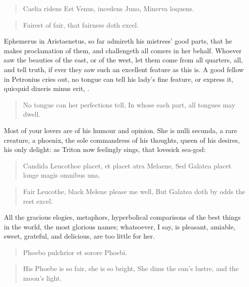 \begin{latin}
\begin{verse}
Caelia ridens
Est Venus, incedens Juno, Minerva loquens.
\end{verse}
\end{latin}

\begin{verse}%
Fairest of fair, that fairness doth excel.
\end{verse}%

Ephemerus in Aristaenetus, so far admireth his mistress' good parts,
that he makes proclamation of them, and challengeth all comers in her
behalf. Whoever saw the beauties of the east, or of the west, let
them come from all quarters, all, and tell truth, if ever they saw such
an excellent feature as this is. A good fellow in Petronius cries out,
no tongue can tell his lady's fine feature, or express it,
quicquid dixeris minus erit, \etc{}.

\begin{verse}%
No tongue can her perfections tell,
In whose each part, all tongues may dwell.
\end{verse}%

Most of your lovers are of his humour and opinion. She is nulli
secunda, a rare creature, a phoenix, the sole commandress of his
thoughts, queen of his desires, his only delight: as Triton now
feelingly sings, that lovesick sea-god:

\begin{latin}
\begin{verse}
Candida Leucothoe placet, et placet atra Melaene,
Sed Galatea placet longe magis omnibus una.
\end{verse}
\end{latin}
\translationrule%
\begin{verse}%
Fair Leucothe, black Melene please me well,
But Galatea doth by odds the rest excel.
\end{verse}%

All the gracious elogies, metaphors, hyperbolical comparisons of the
best things in the world, the most glorious names; whatsoever, I say,
is pleasant, amiable, sweet, grateful, and delicious, are too little
for her.

\begin{latin}
\begin{verse}
Phoebo pulchrior et sorore Phoebi.
\end{verse}
\end{latin}
\translationrule%
\begin{verse}%
His Phoebe is so fair, she is so bright,
She dims the sun's lustre, and the moon's light.
\end{verse}%

